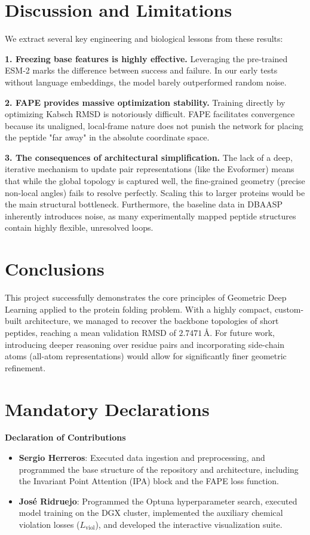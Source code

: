 \documentclass{article}
\begin{document}
\section{Discussion and Limitations}
\label{sec:discussion}

We extract several key engineering and biological lessons from these results:

\textbf{1. Freezing base features is highly effective.} Leveraging the pre-trained ESM-2 marks the difference between success and failure. In our early tests without language embeddings, the model barely outperformed random noise.

\textbf{2. FAPE provides massive optimization stability.} Training directly by optimizing Kabsch RMSD is notoriously difficult. FAPE facilitates convergence because its unaligned, local-frame nature does not punish the network for placing the peptide "far away" in the absolute coordinate space. 

\textbf{3. The consequences of architectural simplification.} The lack of a deep, iterative mechanism to update pair representations (like the Evoformer) means that while the global topology is captured well, the fine-grained geometry (precise non-local angles) fails to resolve perfectly. Scaling this to larger proteins would be the main structural bottleneck. Furthermore, the baseline data in DBAASP inherently introduces noise, as many experimentally mapped peptide structures contain highly flexible, unresolved loops.

\section{Conclusions}
\label{sec:conclusion}

This project successfully demonstrates the core principles of Geometric Deep Learning applied to the protein folding problem. With a highly compact, custom-built architecture, we managed to recover the backbone topologies of short peptides, reaching a mean validation RMSD of $2.7471\,\text{\AA}$. For future work, introducing deeper reasoning over residue pairs and incorporating side-chain atoms (all-atom representations) would allow for significantly finer geometric refinement.

\section*{Mandatory Declarations}

\textbf{Declaration of Contributions}
\begin{itemize}
    \item \textbf{Sergio Herreros}: Executed data ingestion and preprocessing, and programmed the base structure of the repository and architecture, including the Invariant Point Attention (IPA) block and the FAPE loss function.
    \item \textbf{José Ridruejo}: Programmed the Optuna hyperparameter search, executed model training on the DGX cluster, implemented the auxiliary chemical violation losses ($L_{\text{viol}}$), and developed the interactive visualization suite.
\end{itemize}
\end{document}
